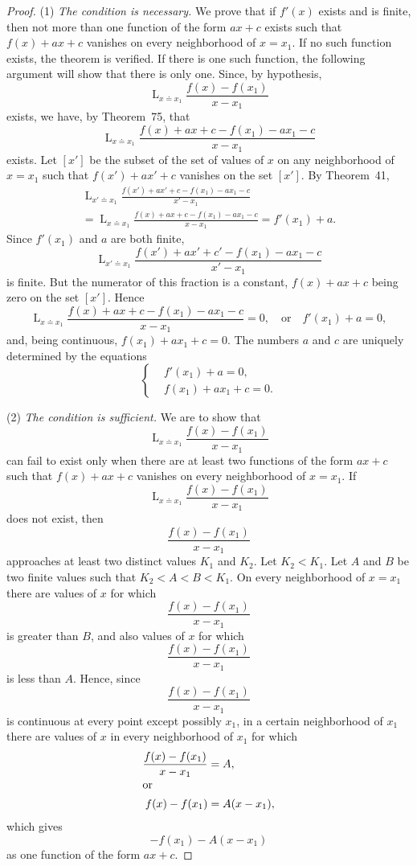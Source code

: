 \documentclass[a4paper,12pt]{book}[2004/02/16]
\providecommand{\hyperlink}[2]{#2}
\theoremstyle{ilemma}
\theoremstyle{itheorem}
\theoremstyle{iother}
\theoremstyle{icorollary}
\theoremstyle{numcorollary}
\theoremstyle{idefinition}
\begin{document}
\begin{proof}(1) \textit{The condition is necessary.} We prove that if $f'(x)$
exists and is finite, then not more than one function of the form
$ax+c$ exists such that $f(x)+ax+c$ vanishes on every neighborhood of
$x=x_1$. If no such function exists, the theorem is verified.  If
there is one such function, the following argument will show that
there is only one. Since, by hypothesis,
\[
  \mathop{L}_{x\doteq x_1} \frac{f(x)-f(x_1)}{x-x_1}
\]
exists, we have, by Theorem~\hyperlink{thm75}{75}, that
\[
  \mathop{L}_{x\doteq x_1} \frac{f(x)+ax+c-f(x_1)-ax_1-c}{x-x_1}
\]
exists. Let $[x']$ be the subset of the set of values of $x$ on any
neighborhood of $x=x_1$ such that $f(x')+ax'+c$ vanishes on the set
$[x']$. By Theorem~\hyperlink{thm41}{41},
\begin{multline*}
  \mathop{L}_{x'\doteq x_1}
  \frac{f(x')+ax'+c-f(x_1)-ax_1-c}{x'-x_1} \\
= \mathop{L}_{x\doteq x_1}
  \frac{f(x)+ax+c-f(x_1)-ax_1-c}{x-x_1}=f'(x_1)+a.
\end{multline*}
Since $f'(x_1)$ and $a$ are both finite,
\[
  \mathop{L}_{x'\doteq x_1}\frac{f(x')+ax'+c'-f(x_1)-ax_1-c}{x'-x_1}
\]
is finite. But the numerator of this fraction is a constant,
$f(x)+ax+c$ being zero on the set $[x']$. Hence
\[
  \mathop{L}_{x\doteq x_1} \frac{f(x)+ax+c-f(x_1)-ax_1-c}{x-x_1}=0,
  \quad \text{or}\quad f'(x_1)+a=0,
\]
and, being continuous, $f(x_1)+ax_1+c=0$.
The numbers $a$ and $c$ are uniquely determined by the equations
\[
  \left\{%
  \begin{aligned}
  & f'(x_1)+a=0,\\
  & f(x_1)+ax_1+c=0.
  \end{aligned}
  \right.
\]

(2) \textit{The condition is sufficient.} We are to show that
\[
  \mathop{L}_{x\doteq x_1} \frac{f(x)-f(x_1)}{x-x_1}
\]
can fail to exist only when there are at least two functions of the
form $ax+c$ such that $f(x) +ax+c$ vanishes on every neighborhood of
$x = x_1$. If
\[
  \mathop{L}_{x\doteq x_1} \frac{f(x)-f(x_1)}{x-x_1}
\]
does not exist, then
\[
  \frac{f(x)-f(x_1)}{x-x_1}
\]
approaches at least two distinct values $K_1$ and $K_2$. Let
$K_2<K_1$.  Let $A$ and $B$ be two finite values such that $K_2 < A <
B < K_1$.  On every neighborhood of $x = x_1$ there are values of $x$
for which
\[
  \frac{f(x)-f(x_1)}{x-x_1}
\]
is greater than $B$, and also values of $x$ for which
\[
  \frac{f(x)-f(x_1)}{x-x_1}
\]
is less than $A$. Hence, since
\[
  \frac{f(x)-f(x_1)}{x-x_1}
\]
is continuous at every point except possibly $x_1$, in a certain
neighborhood of $x_1$ there are values of $x$ in every neighborhood of
$x_1$ for which
\begin{align*}
  \frac{f(x)-f(x_1)}{x-x_1} &= A, \\
  \intertext{or}
  f(x)-f(x_1) &= A(x-x_1),
\end{align*}
which gives
\[
  -f(x_1)-A(x-x_1)
\]
as one function of the form $ax+c$.


\end{proof}
\end{document}
